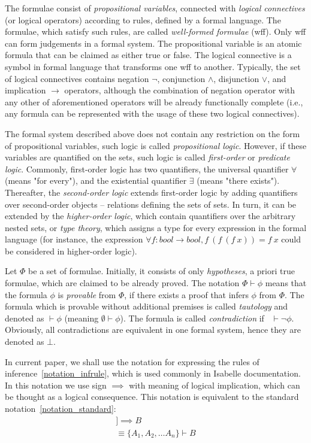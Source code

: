 \documentclass[article]{aaltoseries}
\begin{document}
The formulae consist of \textit{propositional variables}, connected with \textit{logical connectives} (or logical operators) according to rules, defined by a formal language. The formulae, which satisfy such rules, are called \textit{well-formed formulae} (wff). Only wff can form judgements in a formal system. The propositional variable is an atomic formula that can be claimed as either true or false. The logical connective is a symbol in formal language that transforms one wff to another. Typically, the set of logical connectives contains negation $\neg$, conjunction $\land$, disjunction $\lor$, and implication $\rightarrow$ operators, although the combination of negation operator with any other of aforementioned operators will be already functionally complete (i.e., any formula can be represented with the usage of these two logical connectives).

The formal system described above does not contain any restriction on the form of propositional variables, such logic is called \textit{propositional logic}. However, if these variables are quantified on the sets, such logic is called \textit{first-order} or \textit{predicate logic}. Commonly, first-order logic has two quantifiers, the universal quantifier $\forall$ (means "for every"), and the existential quantifier $\exists$ (means "there exists"). Thereafter, the \textit{second-order logic} extends first-order logic by adding quantifiers over second-order objects -- relations defining the sets of sets. In turn, it can be extended by the \textit{higher-order logic}, which contain quantifiers over the arbitrary nested sets, or \textit{type theory}, which assigns a type for every expression in the formal language (for instance, the expression $\forall f: bool \rightarrow bool, f\ (f\ (f\ x)) = f\ x$ could be considered in higher-order logic).

Let $\Phi$ be a set of formulae. Initially, it consists of only \textit{hypotheses}, a priori true formulae, which are claimed to be already proved. The notation $\Phi \vdash \phi$ means that the formula $\phi$ is \textit{provable} from $\Phi$, if there exists a proof that infers $\phi$ from $\Phi$. The formula which is provable without additional premises is called \textit{tautology} and denoted as $ \vdash \phi $ (meaning $\emptyset \vdash \phi$). The formula is called \textit{contradiction} if \ $\vdash \neg \phi$. Obviously, all contradictions are equivalent in one formal system, hence they are denoted as $\bot$.

In current paper, we shall use the notation for expressing the rules of inference~\eqref{notation_infrule}, which is used commonly in Isabelle documentation. In this notation we use sign $\implies$ with meaning of logical implication, which can be thought as a logical consequence. This notation is equivalent to the standard notation~\eqref{notation_standard}:
\begin{gather}
[\![ A_{1}; A_{2}; \dots A_{n} ]\!] \implies B 
    \label{notation_infrule}\\
\equiv \{ A_{1}, A_{2}, \dots A_{n} \} \vdash B
    \label{notation_standard}
\end{gather}
\end{document}
